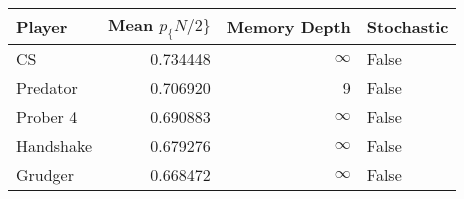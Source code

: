 \begin{tabular}{lrrl}
\toprule
    Player &  Mean $p_\{N/2\}$ &  Memory Depth & Stochastic \\
\midrule
        CS &        0.734448 &            \(\infty\) &      False \\
  Predator &        0.706920 &             9 &      False \\
  Prober 4 &        0.690883 &            \(\infty\) &      False \\
 Handshake &        0.679276 &            \(\infty\) &      False \\
   Grudger &        0.668472 &            \(\infty\) &      False \\
\bottomrule
\end{tabular}
